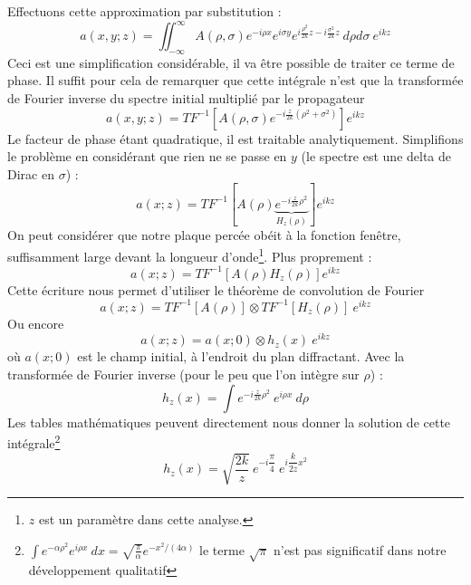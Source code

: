 Effectuons cette approximation par substitution :
\begin{equation}
a(x,y;z) = \iint_{-\infty}^\infty A(\rho,\sigma)e^{-i\rho x}e^{i\sigma y} e^{i\frac{\rho^2}{2k}z
-i\frac{\sigma^2}{2k}z}\ d\rho d\sigma\ e^{ikz}
\end{equation}
Ceci est une simplification considérable, il va être possible de traiter ce terme de phase. Il 
suffit pour cela de remarquer que cette intégrale n'est que la transformée de Fourier inverse 
du spectre initial multiplié par le propagateur
\begin{equation}
a(x,y;z) = TF^{-1}\left[A(\rho,\sigma)e^{-i\frac{z}{2k}(\rho^2+\sigma^2)}\right]e^{ikz}
\end{equation}
Le facteur de phase étant quadratique, il est traitable analytiquement. Simplifions le problème 
en considérant que rien ne se passe en $y$ (le spectre est une delta de Dirac en $\sigma$) :
\begin{equation}
a(x;z) = TF^{-1}\left[A(\rho)\underbrace{e^{-i\frac{z}{2k}\rho^2}}_{H_z(\rho)}\right]e^{ikz}
\end{equation}
On peut considérer que notre plaque percée obéit à la fonction fenêtre, suffisamment large devant 
la longueur d'onde\footnote{$z$ est un paramètre dans cette analyse.}. Plus proprement :
\begin{equation}
a(x;z) = TF^{-1}[A(\rho)H_z(\rho)]e^{ikz}
\end{equation}
Cette écriture nous permet d'utiliser le théorème de convolution de Fourier
\begin{equation}
a(x;z) = TF^{-1}[A(\rho)]\otimes TF^{-1}[H_z(\rho)]\ e^{ikz}
\end{equation}
Ou encore
\begin{equation}
a(x;z) = a(x;0)\otimes h_z(x)\ e^{ikz}
\end{equation}
où $a(x;0)$ est le champ initial, à l'endroit du plan diffractant. Avec la transformée de 
Fourier inverse (pour le peu que l'on intègre sur $\rho$) :
\begin{equation}
h_z(x) = \int e^{-i\frac{z}{2k}\rho^2}\ e^{i\rho x}\ d\rho
\end{equation}
Les tables mathématiques peuvent directement nous donner la solution de cette intégrale\footnote{$\int e^{-\alpha \rho^2} e^{i\rho x}\ d x = \sqrt{\frac{\pi}{\alpha}} e^{-x^2/(4\alpha)}$ le terme $\sqrt{\pi}$ n'est pas significatif dans notre développement qualitatif}
\begin{equation}
h_z(x) = \sqrt{\frac{2k}{z}}\ e^{-i\dfrac{\pi}{4}}\ e^{i\dfrac{k}{2z}x^2}
\end{equation}
